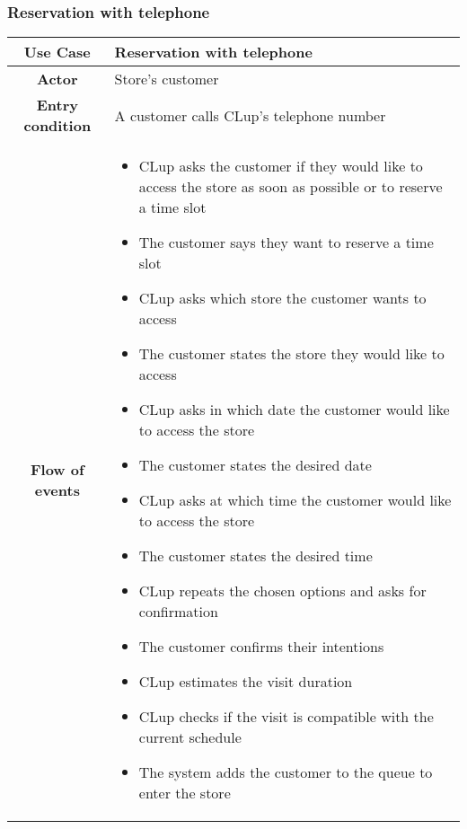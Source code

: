 \documentclass[../../main.tex]{subfiles}
\begin{document}
      \subsubsection{Reservation with telephone}

      \begin{table}[H]
        \centering
          \begin{tabular}{c m{}}
          \hline
          \textbf{Use Case} & Reservation with telephone\\ \hline
          \textbf{Actor} & Store's customer\\ \hline
          \textbf{Entry condition} & A customer calls CLup's telephone number\\  \hline
          \textbf{Flow of events} & \begin{itemize}
                                      \item CLup asks the customer if they would like to access the store as soon as possible or to reserve a time slot
                                      \item The customer says they want to reserve a time slot
                                      \item CLup asks which store the customer wants to access
                                      \item The customer states the store they would like to access
                                      \item CLup asks in which date the customer would like to access the store
                                      \item The customer states the desired date
                                      \item CLup asks at which time the customer would like to access the store
                                      \item The customer states the desired time
                                      \item CLup repeats the chosen options and asks for confirmation
                                      \item The customer confirms their intentions
                                      \item CLup estimates the visit duration
                                      \item CLup checks if the visit is compatible with the current schedule
                                      \item The system adds the customer to the queue to enter the store

\end{itemize}
\end{tabular}
\end{table}
\end{document}
